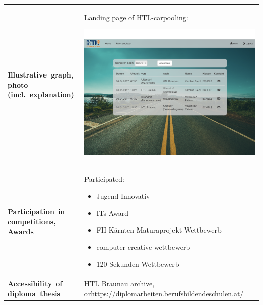 \renewcommand{\arraystretch}{2}
\begin{tabularx}{1\textwidth}{ p{3.5cm} X }

\textbf{\mbox{Illustrative graph,} \mbox{photo} \mbox{(incl. explanation)}} & 
{
Landing page of HTL-carpooling:
\begin{center}
	\includegraphics[width=1\linewidth]{media/images/typ_screen}
\end{center}
} \\
  
\textbf{\mbox{Participation in} competitions, Awards} & 
{
Participated:
\begin{itemize}
\item Jugend Innovativ
\item ITs Award
\item FH Kärnten Maturaprojekt-Wettbewerb
\item computer creative wettbewerb
\item 120 Sekunden Wettbewerb
\end{itemize}
} \\

\textbf{\mbox{Accessibility of} \mbox{diploma thesis}} & 
{HTL Braunau archive, or\newline \url{https://diplomarbeiten.berufsbildendeschulen.at/}} \\



\end{tabularx}






